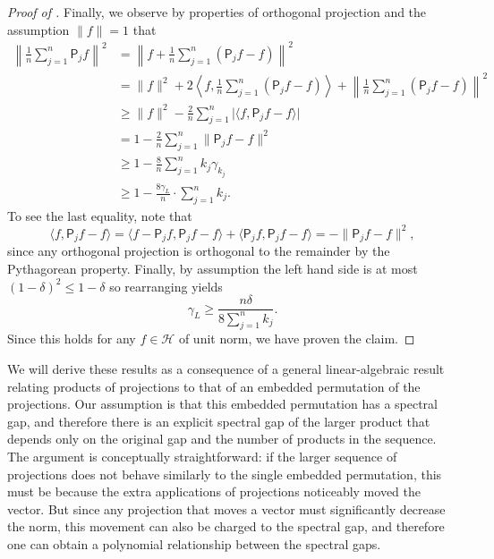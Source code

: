 \documentclass[10pt,a4paper]{amsart}
\begin{document}
\begin{proof}[Proof of ]
Finally, we observe by properties of orthogonal projection and the assumption $\|f\|=1$ that
\begin{align*}
    \left\| \frac{1}{n}\sum_{j=1}^n \mathsf{P}_jf\right\|^2&=\left\|f+ \frac{1}{n}\sum_{j=1}^n (\mathsf{P}_jf-f)\right\|^2\\
    &=\|f\|^2+2\left\langle f,\frac{1}{n}\sum_{j=1}^n (\mathsf{P}_jf-f)\right\rangle+\left\|\frac{1}{n}\sum_{j=1}^n (\mathsf{P}_jf-f)\right\|^2\\
    &\geq \|f\|^2-\frac{2}{n}\sum_{j=1}^n \vert \langle f,\mathsf{P}_jf-f\rangle\vert\\
    &=1-\frac{2}{n}\sum_{j=1}^n \|\mathsf{P}_jf-f\|^2\\
    &\geq 1-\frac{8}{n}\sum_{j=1}^n k_j\gamma_{k_j}\\
    &\geq 1-\frac{8\gamma_{L}}{n}\cdot \sum_{j=1}^n k_j.
\end{align*}
To see the last equality, note that
\begin{equation*}
    \langle f,\mathsf{P}_jf-f\rangle = \langle f-\mathsf{P}_jf,\mathsf{P}_jf-f\rangle+ \langle\mathsf{P}_jf,\mathsf{P}_jf-f\rangle = -\|\mathsf{P}_jf-f\|^2,
\end{equation*}
since any orthogonal projection is orthogonal to the remainder by the Pythagorean property.
Finally, by assumption the left hand side is at most $(1-\delta)^2\leq 1-\delta$ so rearranging yields
\begin{equation*}
    \gamma_{L} \geq \frac{n\delta}{8\sum_{j=1}^n k_j}.
\end{equation*}
Since this holds for any $f\in \mathcal{H}$ of unit norm, we have proven the claim.
\end{proof}

We will derive these results as a consequence of a general linear-algebraic result relating products of projections to that of an embedded permutation of the projections. Our assumption is that this embedded permutation has a spectral gap, and therefore there is an explicit spectral gap of the larger product that depends only on the original gap and the number of products in the sequence. The argument is conceptually straightforward: if the larger sequence of projections does not behave similarly to the single embedded permutation, this must be because the extra applications of projections noticeably moved the vector. But since any projection that moves a vector must significantly decrease the norm, this movement can also be charged to the spectral gap, and therefore one can obtain a polynomial relationship between the spectral gaps.
\end{document}

